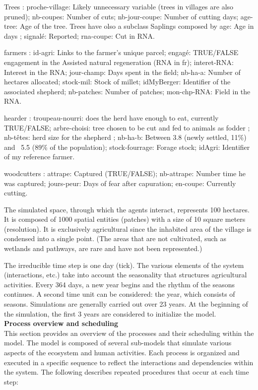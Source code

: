 \documentclass{article}
\begin{document}
        Trees : proche-village: Likely unnecessary variable (trees in villages are also pruned); nb-coupes: Number of cuts; nb-jour-coupe: Number of cutting days; age-tree: Age of the tree. Trees have olso a subclass Saplings composed by age: Age in days ; signalé: Reported; rna-coupe: Cut in RNA.


        farmers : id-agri: Links to the farmer's unique parcel; engagé: TRUE/FALSE engagement in the Assisted natural regeneration (RNA in fr); interet-RNA: Interest in the RNA; jour-champ: Days spent in the field; nb-ha-a: Number of hectares allocated; stock-mil: Stock of millet; idMyBerger: Identifier of the associated shepherd; nb-patches: Number of patches; mon-chp-RNA: Field in the RNA.


        hearder : troupeau-nourri: does the herd have enough to eat, currently TRUE/FALSE; arbre-choisi: tree chosen to be cut and fed to animals as fodder ; nb-têtes: herd size for the shepherd ; nb-ha-b: Between 3.8 (newly settled, 11\%) and ~5.5 (89\% of the population); stock-fourrage: Forage stock; idAgri: Identifier of my reference farmer.

        woodcutters : attrape: Captured (TRUE/FALSE); nb-attrape: Number time he was captured; jours-peur: Days of fear after capuration; en-coupe: Currently cutting.


        The simulated space, through which the agents interact, represents 100 hectares. It is composed of 1000 spatial entities (patches) with a size of 10 square meters (resolution). It is exclusively agricultural since the inhabited area of the village is condensed into a single point. (The areas that are not cultivated, such as wetlands and pathways, are rare and have not been represented.)

        The irreducible time step is one day (tick). The various elements of the system (interactions, etc.) take into account the seasonality that structures agricultural activities. Every 364 days, a new year begins and the rhythm of the seasons continues. A second time unit can be considered: the year, which consists of seasons. Simulations are generally carried out over 23 years. At the beginning of the simulation, the first 3 years are considered to initialize the model.\\
    
        \textbf{Process overview and scheduling}\\

        This section provides an overview of the processes and their scheduling within the model. The model is composed of several sub-models that simulate various aspects of the ecosystem and human activities. Each process is organized and executed in a specific sequence to reflect the interactions and dependencies within the system. The following describes repeated procedures that occur at each time step:
\end{document}
